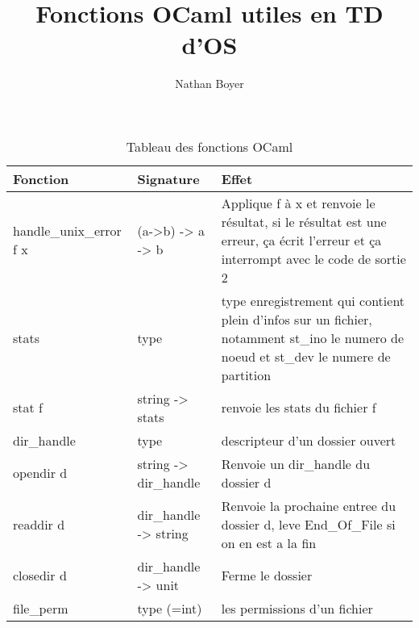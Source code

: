 \documentclass{article}
\title{Fonctions OCaml utiles en TD d'OS}
\author{Nathan Boyer}
\begin{document}
\maketitle

\begin{table}[htbp]
    \centering
    \begin{tabular}{|p{4cm}|p{3cm}|p{7cm}|} %
        \hline
        Fonction & Signature & Effet \\ 
        \hline 
        handle\_unix\_error f x & (a->b) -> a -> b & Applique f à x et renvoie le résultat, si le résultat est une erreur, ça écrit l'erreur et ça interrompt avec le code de sortie 2 \\ 
        \hline 
        stats & type & type enregistrement qui contient plein d'infos sur un fichier, notamment st\_ino le numero de noeud et st\_dev le numere de partition \\ 
        \hline 
        stat f & string -> stats & renvoie les stats du fichier f \\ 
        \hline 
        dir\_handle & type & descripteur d'un dossier ouvert \\ 
        \hline 
        opendir d & string -> dir\_handle & Renvoie un dir\_handle du dossier d \\ 
        \hline 
        readdir d & dir\_handle -> string & Renvoie la prochaine entree du dossier d, leve End\_Of\_File si on en est a la fin \\ 
        \hline 
        closedir d & dir\_handle -> unit & Ferme le dossier \\ 
        \hline 
        file_perm & type (=int) & les permissions d'un fichier \\ 
        \hline 
    \end{tabular}
    \caption{Tableau des fonctions OCaml}
    \label{tab:tableau1} 
\end{table}
\end{document}
